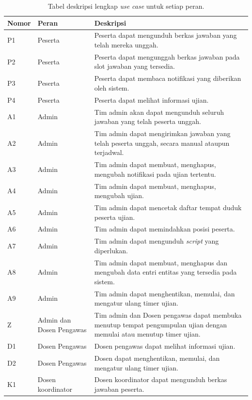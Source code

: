 \begin{table}[ht]
    \centering
    \caption{Tabel deskripsi lengkap \textit{use case} untuk setiap peran.}
    \label{tab:usecase_desc}
    \begin{tabularx}{\textwidth}{|p{1.2cm}|p{2cm}|X|}
         \hline
         Nomor & Peran & Deskripsi  \\
         \hline
         P1 & Peserta & Peserta dapat mengunduh berkas jawaban yang telah mereka unggah. \\
         \hline
         P2 & Peserta & Peserta dapat mengunggah berkas jawaban pada slot jawaban yang tersedia. \\
         \hline
         P3 & Peserta & Peserta dapat membaca notifikasi yang diberikan oleh sistem. \\
         \hline
         P4 & Peserta & Peserta dapat melihat informasi ujian. \\
         \hline
         A1 & Admin & Tim admin akan dapat mengunduh seluruh jawaban yang telah peserta unggah. \\
         \hline
         A2 & Admin & Tim admin dapat mengirimkan jawaban yang telah peserta unggah, secara manual ataupun terjadwal. \\
         \hline
         A3 & Admin & Tim admin dapat membuat, menghapus, mengubah notifikasi pada ujian tertentu. \\
         \hline
         A4 & Admin & Tim admin dapat membuat, menghapus, mengubah ujian. \\
         \hline
         A5 & Admin & Tim admin dapat mencetak daftar tempat duduk peserta ujian. \\
         \hline
         A6 & Admin & Tim admin dapat memindahkan posisi peserta. \\
         \hline
         A7 & Admin & Tim admin dapat mengunduh \textit{script} yang diperlukan. \\
         \hline
         A8 & Admin & Tim admin dapat membuat, menghapus dan mengubah data entri entitas yang tersedia pada sistem. \\
         \hline
         A9 & Admin & Tim admin dapat menghentikan, memulai, dan mengatur ulang timer ujian. \\
         \hline
         Z & Admin dan Dosen Pengawas & Tim admin dan Dosen pengawas dapat membuka menutup tempat pengumpulan ujian dengan
         memulai atau menutup timer ujian. \\
         \hline
         D1 & Dosen Pengawas & Dosen pengawas dapat melihat informasi ujian. \\
         \hline
         D2 & Dosen Pengawas & Dosen dapat menghentikan, memulai, dan mengatur ulang timer ujian. \\
         \hline
         K1 & Dosen koordinator & Dosen koordinator dapat mengunduh berkas jawaban peserta. \\
         \hline
    \end{tabularx}
\end{table}

